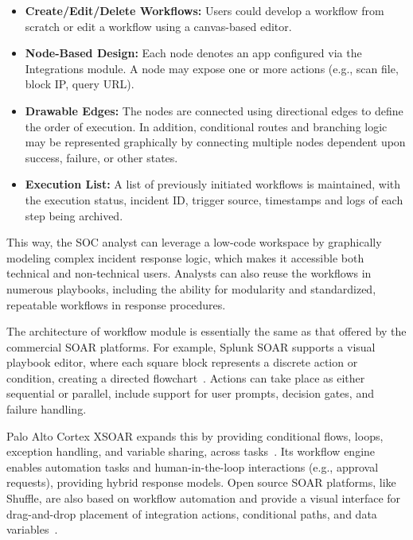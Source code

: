 \begin{itemize}[noitemsep,topsep=0pt]
    \item \textbf{Create/Edit/Delete Workflows:} Users could develop a workflow from scratch or edit a workflow using a canvas-based editor.
    
    \item \textbf{Node-Based Design:} Each node denotes an app configured via the Integrations module. A node may expose one or more actions (e.g., scan file, block IP, query URL).
    
    \item \textbf{Drawable Edges:} The nodes are connected using directional edges to define the order of execution. In addition, conditional routes and branching logic may be represented graphically by connecting multiple nodes dependent upon success, failure, or other states.
    
    \item \textbf{Execution List:} A list of previously initiated workflows is maintained, with the execution status, incident ID, trigger source, timestamps and logs of each step being archived.
\end{itemize}

This way, the SOC analyst can leverage a low-code workspace by graphically modeling complex incident response logic, which makes it accessible both technical and non-technical users. Analysts can also reuse the workflows in numerous playbooks, including the ability for modularity and standardized, repeatable workflows in response procedures.

The architecture of workflow module is essentially the same as that offered by the commercial SOAR platforms. For example, Splunk SOAR supports a visual playbook editor, where each square block represents a discrete action or condition, creating a directed flowchart~\cite{splunk}. Actions can take place as either sequential or parallel, include support for user prompts, decision gates, and failure handling.

Palo Alto Cortex XSOAR expands this by providing conditional flows, loops, exception handling, and variable sharing, across tasks~\cite{paloalto}. Its workflow engine enables automation tasks and human-in-the-loop interactions (e.g., approval requests), providing hybrid response models.
Open source SOAR platforms, like Shuffle, are also based on workflow automation and provide a visual interface for drag-and-drop placement of integration actions, conditional paths, and data variables~\cite{techtarget}.

